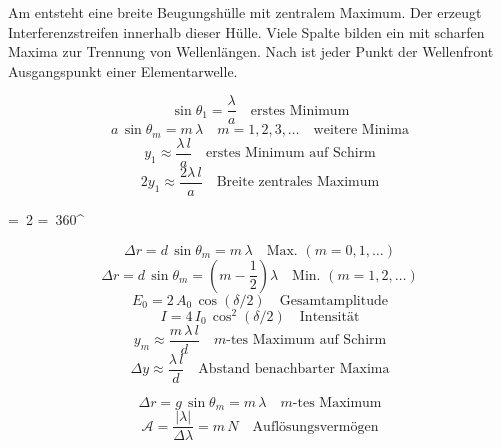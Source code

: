 \begin{runintext}
Am  entsteht eine breite Beugungshülle mit zentralem Maximum. Der  erzeugt Interferenzstreifen innerhalb dieser Hülle. Viele Spalte bilden ein  mit scharfen Maxima zur Trennung von Wellenlängen. Nach  ist jeder Punkt der Wellenfront Ausgangspunkt einer Elementarwelle.
\end{runintext}
\begin{formulabox}
\[ \sin\theta_1 = \frac{\lambda}{a} \quad \text{erstes Minimum} \]
\[ a\,\sin\theta_m = m\,\lambda \quad m = 1,2,3,\ldots \quad \text{weitere Minima} \]
\[ y_1 \approx \frac{\lambda\,l}{a} \quad \text{erstes Minimum auf Schirm} \]
\[ 2y_1 \approx \frac{2\lambda\,l}{a} \quad \text{Breite zentrales Maximum} \]
\end{formulabox}
\begin{formulabox}
\begin{longformula}
\delta = \,2\pi
= \,360^\circ
\end{longformula}
\[ \Delta r = d\,\sin\theta_m = m\,\lambda \quad \text{Max. } (m=0,1,\dots) \]
\[ \Delta r = d\,\sin\theta_m = \left(m-\frac{1}{2}\right)\lambda \quad \text{Min. } (m=1,2,\dots) \]
\[ E_0 = 2\,A_0\,\cos(\delta/2) \quad \text{Gesamtamplitude} \]
\[ I = 4\,I_0\,\cos^2(\delta/2) \quad \text{Intensität} \]
\[ y_m \approx \frac{m\,\lambda\,l}{d} \quad \text{$m$-tes Maximum auf Schirm} \]
\[ \Delta y \approx \frac{\lambda\,l}{d} \quad \text{Abstand benachbarter Maxima} \]
\end{formulabox}
\begin{formulabox}
\[ \Delta r = g\,\sin\theta_m = m\,\lambda \quad \text{$m$-tes Maximum} \]
\[ \mathcal{A} = \frac{|\lambda|}{\Delta\lambda} = m\,N \quad \text{Auflösungsvermögen} \]
\end{formulabox}

